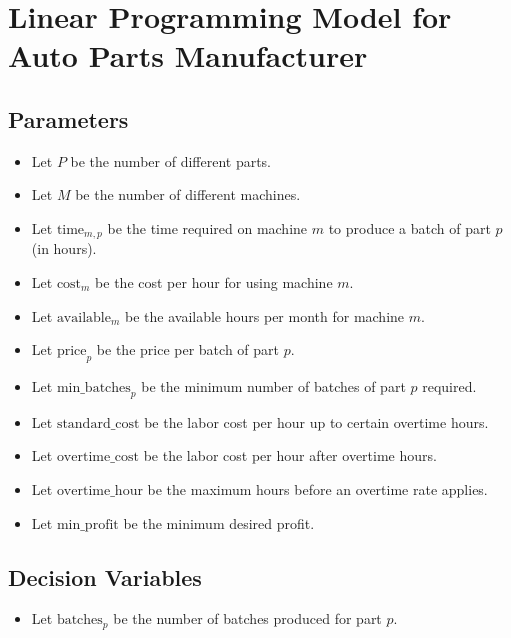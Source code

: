 \documentclass{article}
\begin{document}
\section*{Linear Programming Model for Auto Parts Manufacturer}

\subsection*{Parameters}
\begin{itemize}
    \item Let \( P \) be the number of different parts.
    \item Let \( M \) be the number of different machines.
    \item Let \( \text{time}_{m,p} \) be the time required on machine \( m \) to produce a batch of part \( p \) (in hours).
    \item Let \( \text{cost}_{m} \) be the cost per hour for using machine \( m \).
    \item Let \( \text{available}_{m} \) be the available hours per month for machine \( m \).
    \item Let \( \text{price}_{p} \) be the price per batch of part \( p \).
    \item Let \( \text{min\_batches}_{p} \) be the minimum number of batches of part \( p \) required.
    \item Let \( \text{standard\_cost} \) be the labor cost per hour up to certain overtime hours.
    \item Let \( \text{overtime\_cost} \) be the labor cost per hour after overtime hours.
    \item Let \( \text{overtime\_hour} \) be the maximum hours before an overtime rate applies.
    \item Let \( \text{min\_profit} \) be the minimum desired profit.
\end{itemize}

\subsection*{Decision Variables}
\begin{itemize}
    \item Let \( \text{batches}_{p} \) be the number of batches produced for part \( p \).
\end{itemize}
\end{document}
